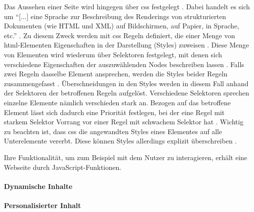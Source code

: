             Das Aussehen einer Seite wird hingegen über \gls{css} festgelegt \cite{w3c:css}.
            Dabei handelt es sich um "`[...] eine Sprache zur Beschreibung des Renderings
            von strukturierten Dokumenten (wie HTML und XML) auf Bildschirmen, auf Papier,
            in Sprache, etc."' \cite{w3c:css}.
            Zu diesem Zweck werden mit \gls{css} Regeln definiert,
            die einer Menge von \gls{html}-Elementen Eigenschaften in der Darstellung (Styles) zuweisen
            \cite{w3c:cssSyntax}.
            Diese Menge von Elementen wird wiederum über Selektoren festgelegt,
            mit denen sich verschiedene Eigenschaften der auszuwählenden Nodes beschreiben lassen
            \cite{w3c:cssSelectors}.
            Falls zwei Regeln dasselbe Element ansprechen,
            werden die Styles beider Regeln zusammengefasst
            \cite{w3c:cssCascading}.
            Überschneidungen in den Styles werden in diesem Fall anhand der Selektoren der betroffenen Regeln aufgelöst.
            Verschiedene Selektoren sprechen einzelne Elemente nämlich verschieden stark an.
            Bezogen auf das betroffene Element lässt sich dadurch eine Priorität festlegen,
            bei der eine Regel mit starkem Selektor Vorrang vor einer Regel mit schwachem Selektor hat
            \cite{w3c:cssSelectors}. 
            Wichtig zu beachten ist, dass \gls{css} die angewandten Styles eines Elementes auf alle Unterelemente vererbt.
            Diese können Styles allerdings explizit überschreiben
            \cite{w3c:cssCascading}.
            
            Ihre Funktionalität, um zum Beispiel mit dem Nutzer zu interagieren,
            erhält eine Webseite durch JavaScript-Funktionen.


            \paragraph*{Dynamische Inhalte}
            \paragraph*{Personalisierter Inhalt}